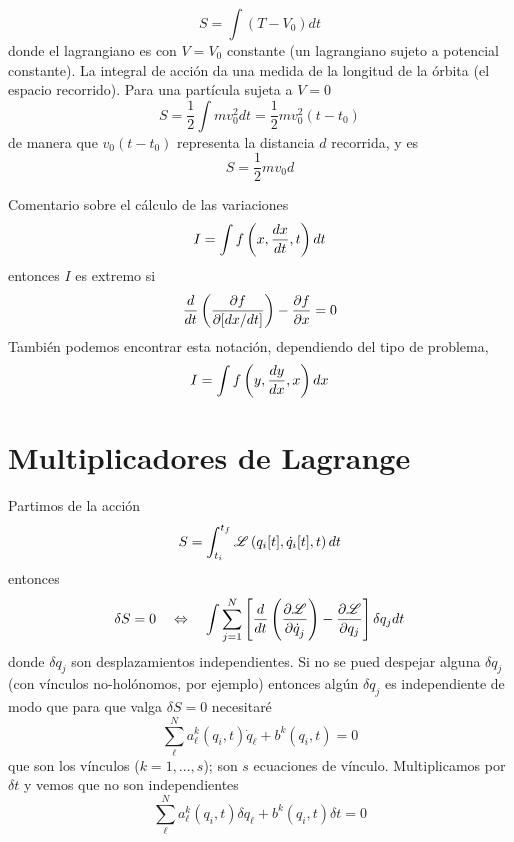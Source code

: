 \documentclass[10pt,oneside]{CBFT_book}
\begin{document}
\[
	S = \int (T-V_0) dt
\]
donde el lagrangiano es con $V=V_0$ constante (un lagrangiano sujeto a potencial constante).
La integral de acción da una medida de la longitud de la órbita (el espacio recorrido).
Para una partícula sujeta a $V=0$
\[
	S = \frac{1}{2}\int m v_0^2 dt = \frac{1}{2}mv_0^2(t-t_0)
\]
de manera que $v_0(t-t_0)$ representa la distancia $d$ recorrida, y es 
\[
	S = \frac{1}{2}mv_0 d
\]

Comentario sobre el cálculo de las variaciones
\[
	I = \int f\left(x, \frac{d^{\hspace{-0.05em}} {x}}{d {t}^{\hspace{-0.05em}}}, t\right) dt 
\]
entonces $I$ es extremo si
\[
	\frac{d}{dt} \left( \frac{\partial^{\hspace{-0.05em}} {f}}{\partial {[dx/dt]}^{\hspace{-0.05em}}}\right) - \frac{\partial^{\hspace{-0.05em}} {f}}{\partial {x}^{\hspace{-0.05em}}} = 0
\]
También podemos encontrar esta notación, dependiendo del tipo de problema,
\[
	I = \int f\left(y, \frac{d^{\hspace{-0.05em}} {y}}{d {x}^{\hspace{-0.05em}}}, x\right) dx 
\]


\section{Multiplicadores de Lagrange}

Partimos de la acción
\[
	S = \int_{t_i}^{t_f} \mathscr{L} \left( q_i[t], \dot{q}_i[t], t \right) dt
\]
entonces 
\[
	\delta S = 0 \quad \Leftrightarrow \quad \int
	\sum_{j=1}^{N} \left[ \frac{d}{dt}\left( \frac{\partial^{\hspace{-0.05em}} {\mathscr{L}}}{\partial {\dot{q}_j}^{\hspace{-0.05em}}} \right) -
	\frac{\partial^{\hspace{-0.05em}} {\mathscr{L}}}{\partial {q_j}^{\hspace{-0.05em}}} \right]\delta q_j dt
\]
donde $\delta q_j$ son desplazamientos independientes. Si no se pued despejar alguna $\delta q_j$ (con 
vínculos no-holónomos, por ejemplo) entonces algún $\delta q_j$ es independiente de modo que para que 
valga $\delta S =0 $ necesitaré 
\[
	\sum_{\ell}^N a_\ell^k(q_i,t) \dot{q}_\ell + b^k(q_i,t) = 0
\]
que son los vínculos ($k=1,...,s$); son $s$ ecuaciones de vínculo.
Multiplicamos por $\delta t$ y vemos que no son independientes
\[
	\sum_{\ell}^N a_\ell^k(q_i,t) \delta {q}_\ell + b^k(q_i,t) \delta t= 0
\]
\end{document}
